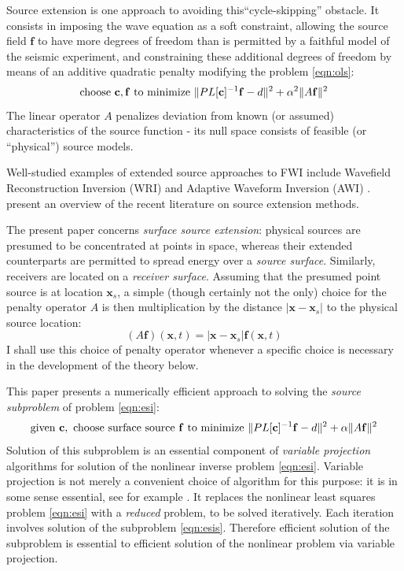\documentclass[12pt]{geophysics}
\newcommand{\bx}{\mathbf{x}}
\newcommand{\bff}{\mathbf{f}}
\begin{document}
Source extension is one approach to avoiding this``cycle-skipping''
obstacle. It consists in imposing the wave equation as a soft
constraint, allowing the source field $\bff$ to have more degrees of
freedom than is permitted by a faithful model of the seismic
experiment, and constraining these additional degrees of freedom by
means of an additive quadratic penalty modifying the problem
\ref{eqn:ols}:
\begin{equation}
\label{eqn:esi}
\mbox{choose } {\bf c}, \bff \mbox{ to minimize } \|PL[{\bf c}]^{-1}\bff -d \|^2 + \alpha^2 \|A\bff\|^2 
\end{equation}
The linear operator $A$ penalizes deviation from known (or assumed)
characteristics of the source function - its null space consists of
feasible (or ``physical'') source models.

Well-studied examples of extended source approaches to FWI include
Wavefield Reconstruction Inversion (WRI)  \cite[]{LeeuwenHerrmannWRI:13,LeeuwenHerrmann:16,Lietal:18,Aghmiryetal:20,Louboutinetal:20} and Adaptive Waveform
Inversion (AWI)
\cite[]{Warner:16,GuachWarnerRavaut:GEO19,Guaschetal:NPJDM20,Yongetal:EAGE21,Warneretal:SEG21}. \cite{HuangNammourSymesDollizal:SEG19}
present an overview of the recent
literature on source extension methods.

The present paper concerns {\em surface source extension}: physical
sources are presumed to be concentrated at points in space, whereas
their extended counterparts are permitted to spread energy over a {\em
  source surface}. Similarly, receivers are located on a {\em receiver
  surface}. Assuming that the presumed point source is at location
$\bx_s$, a simple (though certainly not the only) choice for the
penalty operator $A$ is then multiplication by the distance
$|\bx-\bx_s|$ to the physical source location:
\begin{equation}
  \label{eqn:penop}
  (A\bff)(\bx,t) = |\bx-\bx_s|\bff(\bx,t)
\end{equation}
I shall use this choice of penalty operator whenever a specific choice
is necessary in the development of the theory below.

This paper presents a numerically efficient approach to solving the
{\em source subproblem} of problem \ref{eqn:esi}:
\begin{equation}
\label{eqn:esis}
\mbox{given } {\bf c}, \mbox{ choose surface source } \bff \mbox{ to minimize }
\|PL[{\bf c}]^{-1}\bff -d \|^2 + \alpha \|A\bff\|^2 
\end{equation}
Solution of this subproblem is an essential component of {\em variable
  projection} algorithms for solution of the nonlinear inverse problem
\ref{eqn:esi}. Variable projection is not merely a convenient choice
of algorithm for this purpose: it is in some sense essential, see for
example \cite{Symes:SEG20}. It replaces the nonlinear
least squares problem \ref{eqn:esi} with a {\em reduced} problem, to
be solved iteratively. Each iteration involves solution of the
subproblem \ref{eqn:esis}. Therefore efficient solution of the
subproblem is essential to efficient solution of the nonlinear problem
via variable projection.
\end{document}
